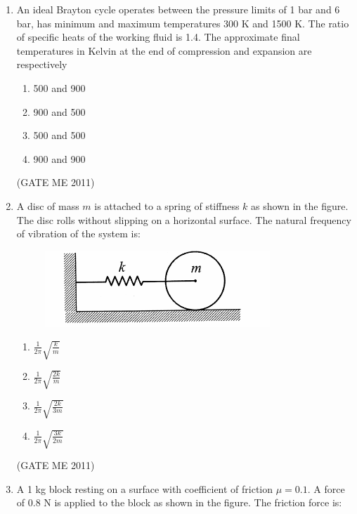 \documentclass[journal]{IEEEtran}
\begin{document}
\begin{enumerate}
\item An ideal Brayton cycle operates between the pressure limits of  1 bar and 6 bar, has minimum and maximum temperatures 300 K and 1500 K. The ratio of specific heats of the working fluid is 1.4. The approximate final temperatures in Kelvin at the end of compression and expansion are respectively
\begin{multicols}{4}
\begin{enumerate}
\item 500 and 900  
\item 900 and 500  
\item 500 and 500  
\item 900 and 900  
\end{enumerate}
\end{multicols}   
\hfill (GATE ME 2011)

\item A disc of mass $ m $ is attached to a spring of stiffness $ k $  as shown in the figure. The disc rolls without slipping on a horizontal surface. The natural frequency of vibration of the system is:

\begin{figure}[H]
    \centering
    \includegraphics[width=0.8\textwidth]{Fig 9.png}
    \caption{}
    \label{fig:question42}
\end{figure}

\begin{multicols}{4}
\begin{enumerate}
\item $ \frac{1}{2\pi} \sqrt{\frac{k}{m}} $  
\item $ \frac{1}{2\pi} \sqrt{\frac{2k}{m}} $  
\item $ \frac{1}{2\pi} \sqrt{\frac{2k}{3m}} $  
\item $ \frac{1}{2\pi} \sqrt{\frac{3k}{2m}} $  
\end{enumerate}
\end{multicols}   
\hfill (GATE ME 2011)

\item A 1 kg block resting on a surface with coefficient of friction $ \mu = 0.1 $. A force of 0.8 N is applied to the block as shown in the figure. The friction force is:


\end{enumerate}
\end{document}
